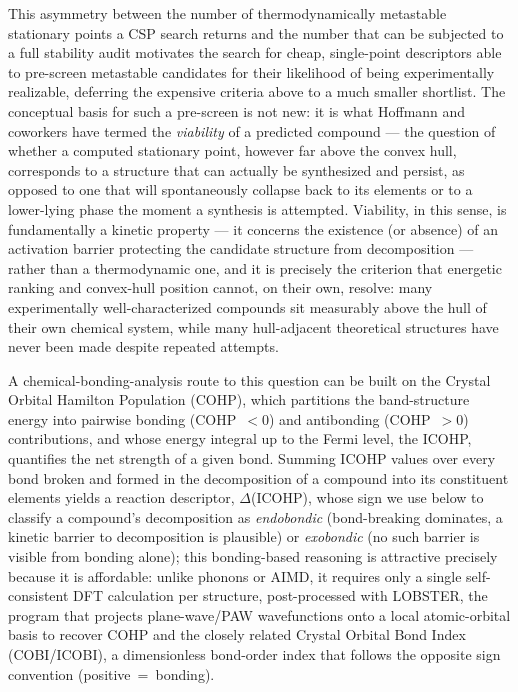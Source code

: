 \documentclass[journal=jpccck,manuscript=article]{achemso}
\begin{document}
This asymmetry between the number of thermodynamically metastable
stationary points a CSP search returns and the number that can be
subjected to a full stability audit motivates the search for cheap,
single-point descriptors able to pre-screen metastable candidates for their
likelihood of being experimentally realizable, deferring the expensive
criteria above to a much smaller shortlist. The conceptual basis for such a
pre-screen is not new: it is what Hoffmann and coworkers have termed the
\emph{viability} of a predicted compound --- the question of whether a
computed stationary point, however far above the convex hull, corresponds to
a structure that can actually be synthesized and persist, as opposed to one
that will spontaneously collapse back to its elements or to a
lower-lying phase the moment a synthesis is attempted.\cite{hoffmann1987,grochala2007}
Viability, in this sense, is fundamentally a kinetic property --- it concerns
the existence (or absence) of an activation barrier protecting the candidate
structure from decomposition --- rather than a thermodynamic one, and it is
precisely the criterion that energetic ranking and convex-hull position
cannot, on their own, resolve: many experimentally well-characterized
compounds sit measurably above the hull of their own chemical system, while
many hull-adjacent theoretical structures have never been made despite
repeated attempts.

A chemical-bonding-analysis route to this question can be built on the
Crystal Orbital Hamilton Population (COHP), which partitions the
band-structure energy into pairwise bonding (COHP~$<0$) and antibonding
(COHP~$>0$) contributions, and whose energy integral up to the Fermi level,
the ICOHP, quantifies the net strength of a given
bond.\cite{dronskowski1993,maintz2016} Summing ICOHP values over every bond
broken and formed in the decomposition of a compound into its constituent
elements yields a reaction descriptor, $\Delta$(ICOHP), whose sign we use
below to classify a compound's decomposition as \emph{endobondic}
(bond-breaking dominates, a kinetic barrier to decomposition is plausible) or
\emph{exobondic} (no such barrier is visible from bonding alone); this
bonding-based reasoning is attractive precisely because it is affordable:
unlike phonons or AIMD, it requires only a single self-consistent DFT
calculation per structure, post-processed with
LOBSTER,\cite{maintz2016,nelson2020} the program that projects
plane-wave/PAW wavefunctions onto a local atomic-orbital basis to recover
COHP and the closely related Crystal Orbital Bond Index
(COBI/ICOBI),\cite{muller2021,george2022} a dimensionless bond-order index
that follows the opposite sign convention (positive~=~bonding).
\end{document}
